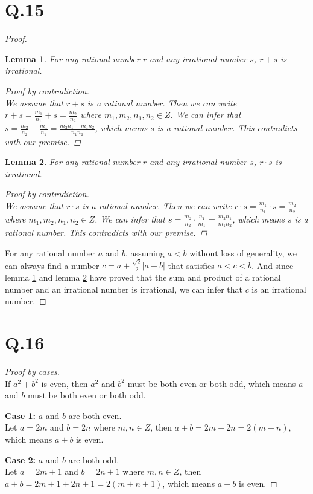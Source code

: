 \documentclass[a4paper,12pt]{article}
\newtheorem{lemma}{Lemma}
\begin{document}
\section*{Q.15}
\begin{proof}
	\begin{lemma}
		\label{lemma:1}
		For any rational number $r$ and any irrational number $s$, $r + s$ is irrational.
		\begin{proof}[Proof by contradiction]
			$ $\\
			We assume that $r + s$ is a rational number. 
			Then we can write $r + s = \frac{m_1}{n_1} + s = \frac{m_2}{n_2}$ where $m_1,m_2,n_1,n_2 \in Z$.
			We can infer that $s = \frac{m_2}{n_2} - \frac{m_1}{n_1} = \frac{m_2n_1-m_1n_2}{n_1n_2}$, which means $s$ is a rational number.
			This contradicts with our premise.
		\end{proof}
	\end{lemma}

	\begin{lemma}
		\label{lemma:2}
		For any rational number $r$ and any irrational number $s$, $r \cdot s$ is irrational.
		\begin{proof}[Proof by contradiction]
			$ $\\
			We assume that $r \cdot s$ is a rational number. 
			Then we can write $r \cdot s = \frac{m_1}{n_1} \cdot s = \frac{m_2}{n_2}$ where $m_1,m_2,n_1,n_2 \in Z$.
			We can infer that $s = \frac{m_2}{n_2} \cdot \frac{n_1}{m_1} = \frac{m_2n_1}{m_1n_2}$, which means $s$ is a rational number.
			This contradicts with our premise.
		\end{proof}
	\end{lemma}
	For any rational number $a$ and $b$, assuming $a < b$ without loss of generality, we can always find a number $c = a + \frac{\sqrt{2}}{2} |a - b|$ that satisfies $a < c < b$.
	And since lemma \ref{lemma:1} and lemma \ref{lemma:2} have proved that the sum and product of a rational number and an irrational number is irrational, we can infer that $c$ is an irrational number.
\end{proof}

\section*{Q.16}
\begin{proof}[Proof by cases]
	$ $\\
	If $a^2+b^2$ is even, then $a^2$ and $b^2$ must be both even or both odd, which means $a$ and $b$ must be both even or both odd.
	
	\textbf{Case 1:} $a$ and $b$ are both even.\\
	Let $a = 2m$ and $b = 2n$ where $m,n \in Z$, then $a + b = 2m + 2n = 2 (m + n)$, which means $a + b$ is even.

	\textbf{Case 2:} $a$ and $b$ are both odd.\\
	Let $a = 2m + 1$ and $b = 2n + 1$ where $m,n \in Z$, then $a + b = 2m + 1 + 2n + 1 = 2 (m + n + 1)$, which means $a + b$ is even.
\end{proof}
\end{document}
